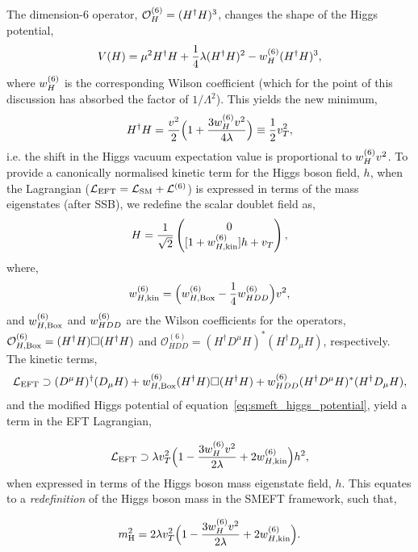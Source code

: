 The dimension-6 operator, $\mathcal{O}^{\rm{(6)}}_H = (H^{\dagger}H)^3$, changes the shape of the Higgs potential,
\begin{equation}\label{eq:smeft_higgs_potential}
    V(H) = \mu^2H^{\dagger}H + \frac{1}{4}\lambda(H^{\dagger}H)^2 - w^{\rm{(6)}}_H (H^{\dagger}H)^3,
\end{equation}
\noindent
where $w^{\rm{(6)}}_H$ is the corresponding Wilson coefficient (which for the point of this discussion has absorbed the factor of $1/\Lambda^2$). This yields the new minimum, 
\begin{equation}
    H^{\dagger}H=\frac{v^2}{2}\Big(1+\frac{3w^{\rm{(6)}}_Hv^2}{4\lambda}\Big) \equiv \frac{1}{2}v_T^2,
\end{equation}
\noindent
i.e. the shift in the Higgs vacuum expectation value is proportional to $w^{\rm{(6)}}_Hv^2$. To provide a canonically normalised kinetic term for the Higgs boson field, $h$, when the Lagrangian ($\mathcal{L}_{\rm{EFT}}=\mathcal{L}_{\rm{SM}}+\mathcal{L}^{\rm{(6)}}$) is expressed in terms of the mass eigenstates (after SSB), we redefine the scalar doublet field as,
\begin{equation}
    H = \frac{1}{\sqrt{2}}\begin{pmatrix}
    0 \\
    [1+w^{\rm{(6)}}_{H,{\rm{kin}}}]h+v_T
    \end{pmatrix},
\end{equation}
\noindent
where,
\begin{equation}
    w^{\rm{(6)}}_{H,{\rm{kin}}} = \Big( w^{\rm{(6)}}_{H,\rm{Box}}-\frac{1}{4}w^{\rm{(6)}}_{HDD} \Big) v^2,
\end{equation}
\noindent
and $w^{\rm{(6)}}_{H,\rm{Box}}$ and $w^{\rm{(6)}}_{HDD}$ are the Wilson coefficients for the operators, ${\mathcal{O}^{(6)}_{H,{\rm{Box}}}=(H^{\dagger}H)\Box(H^{\dagger}H)}$ and ${\mathcal{O}^{(6)}_{HDD}=(H^{\dagger}D^{\mu}H)^*(H^{\dagger}D_{\mu}H)}$, respectively. The kinetic terms,
\begin{equation}
   \mathcal{L}_{\rm{EFT}} \supset (D^\mu H)^{\dagger}(D_\mu H)+w^{\rm{(6)}}_{H,\rm{Box}}(H^{\dagger}H)\Box(H^{\dagger}H)+w^{\rm{(6)}}_{HDD}(H^{\dagger}D^{\mu}H)^*(H^{\dagger}D_{\mu}H),
\end{equation}
\noindent
and the modified Higgs potential of equation~\ref{eq:smeft_higgs_potential}, yield a term in the EFT Lagrangian,

\begin{equation}
\mathcal{L}_{\rm{EFT}} \supset {\lambda}v_T^2\Big(1-\frac{3w^{\rm{(6)}}_Hv^2}{2\lambda}+2w^{\rm{(6)}}_{H,{\rm{kin}}}\Big)h^2,
\end{equation}
\noindent
when expressed in terms of the Higgs boson mass eigenstate field, $h$. This equates to a \textit{redefinition} of the Higgs boson mass in the SMEFT framework, such that,

\begin{equation}
    m_{\rm{H}}^2 = 2{\lambda}v_T^2\Big(1-\frac{3w^{\rm{(6)}}_Hv^2}{2\lambda}+2w^{\rm{(6)}}_{H,{\rm{kin}}}\Big).
\end{equation}



